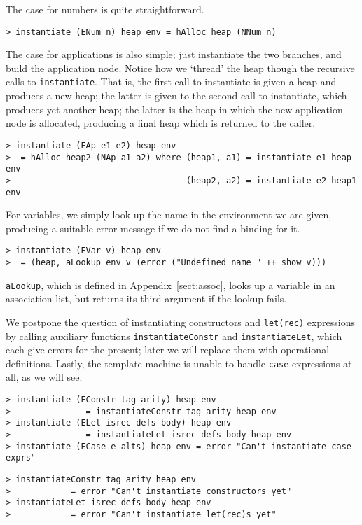 %
\par
\label{page:instantiate}
The case for numbers is quite straightforward.
\begin{verbatim}
> instantiate (ENum n) heap env = hAlloc heap (NNum n)
\end{verbatim}
%
\par
The case for applications is also simple; just instantiate the
two branches, and build the application node.
Notice how we `thread' the heap though the recursive calls to \mbox{\tt instantiate}.
That is, the first call to instantiate is given a heap and produces a new
heap; the latter is given to the second call to instantiate, which produces
yet another heap; the latter is the heap in which the new application node
is allocated, producing a final heap which is returned to the caller.
\begin{verbatim}
> instantiate (EAp e1 e2) heap env
>  = hAlloc heap2 (NAp a1 a2) where (heap1, a1) = instantiate e1 heap  env
>                                   (heap2, a2) = instantiate e2 heap1 env
\end{verbatim}
%
\par
For variables, we simply look up the name in the environment
we are given, producing a suitable error message if we do not find
a binding for it.
\begin{verbatim}
> instantiate (EVar v) heap env
>  = (heap, aLookup env v (error ("Undefined name " ++ show v)))
\end{verbatim}
%
\mbox{\tt aLookup}, which is defined in Appendix~\ref{sect:assoc}, looks up
a variable in an association list, but returns its third argument if the
lookup fails.

We postpone the question of instantiating
constructors and \mbox{\tt let(rec)} expressions
by calling auxiliary functions \mbox{\tt instantiateConstr} and \mbox{\tt instantiateLet},
which each give errors for the present; later we will
replace them with operational definitions.  Lastly, the template machine is
unable to handle \mbox{\tt case} expressions at all, as we will see.
\begin{verbatim}
> instantiate (EConstr tag arity) heap env
>               = instantiateConstr tag arity heap env
> instantiate (ELet isrec defs body) heap env
>               = instantiateLet isrec defs body heap env
> instantiate (ECase e alts) heap env = error "Can't instantiate case exprs"
\end{verbatim}
%
%
%
\begin{verbatim}
> instantiateConstr tag arity heap env
>            = error "Can't instantiate constructors yet"
> instantiateLet isrec defs body heap env
>            = error "Can't instantiate let(rec)s yet"
\end{verbatim}
%
%
